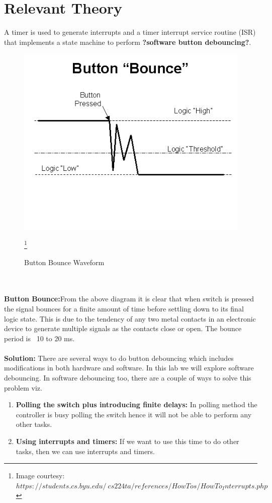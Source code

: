 \documentclass[a4paper,12pt,oneside]{book}
\begin{document}
\section {Relevant Theory}
A timer is used to generate interrupts and a timer interrupt service routine (ISR) that implements a state machine to perform \textbf{?software button debouncing?}.
\begin{figure}
\centering
\includegraphics[scale=0.8]{bounce.PNG}
\caption{Button Bounce Waveform}
\footnote{Image courtesy: $https://students.cs.byu.edu/~cs224ta/references/HowTos/HowTo_Interrupts.php$}
\end{figure}
\\
\\
\textbf{Button Bounce:}From the above diagram it is clear that when switch is pressed the signal bounces for a finite amount of time before settling down to its final logic state. This is due to the tendency of any two metal contacts in an electronic device to generate multiple signals as the contacts close or open. The bounce period is ~10 to 20 ms. 
\\
\\
\textbf{Solution: }There are several ways to do button debouncing which includes modifications in both hardware and software. In this lab we will explore software debouncing. In software debouncing too, there are a couple of ways to solve this problem viz. 
\begin{enumerate}
\item  \textbf{Polling the switch plus introducing finite delays:} 
In polling method the controller is busy polling the switch hence it will not be able to perform any other tasks.
\item \textbf{Using interrupts and timers:} If we want to use this time to do other tasks, then we can use interrupts and timers. \\ 
\end{enumerate}
\end{document}
